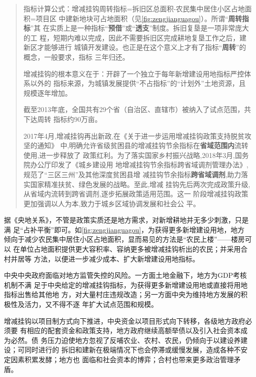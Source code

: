 \begin{quotation}
  指标计算公式：增减挂钩周转指标=拆旧区总面积-农民集中居住小区占地面积=项目区
  中建新地块可占地面积（见\cref{fig:zengjianguagou}）。所谓“\textbf{周转指标}”其
  在实质上是一种指标“\textbf{预借}”或“\textbf{透支}”制度。拆旧复垦是一项非常庞大的工
  程，短期内难以完成，因此不需要拆旧区完成耕地复垦工作之后，建新区才能够进行
  城镇开发建设。也正是在这个意义上才有了指标“\textbf{周转}”的概念，一般要求，指标
  三年归还。

  增减挂钩的根本意义在于：开辟了一个独立于每年新增建设用地指标严控体系以外的
  指标来源，为城镇发展提供“不占指标”的“计划外”土地资源，且规模逐年增加。\cite{yangdi}


  截至2013年底，全国共有29个省（自治区、直辖市）被纳入了试点范围，共下达周转
  指标约90万亩。

  2017年4月,增减挂钩再出新政,在《关于进一步运用增减挂钩政策支持脱贫攻坚的通知》
  中,明确允许省级贫困县的增减挂钩节余指标在\textbf{省域范围内}流转使用,进一步释放了
  政策红利。为了落实国家乡村振兴战略,2018年3月,国务院办公厅印发了《城乡建设用
  地增减挂钩节余指标跨省域调剂管理办法》,规范了“三区三州”及其他深度贫困县增
  减挂钩节余指标\textbf{跨省域调剂},助力落实国家精准扶贫、绿色发展的战略。至此,增减
  挂钩先后两次完成政策升级,从省域内流转到跨省调剂,逐步拓展政策适用范围。这一
  阶段增减挂钩政策更加强调以人为本,致力于城乡区域协调发展和社会公
  平。\cite{zengjianzongshu}
\end{quotation}

据《央地关系》，不管是政策实质还是地方需求，对新增耕地并无多少刺激，只是满
足“占补平衡”即可。如\cref{fig:zengjianguagou}，为获得更多新增建设用地，地方
倾向于减少农民集中居住小区占地面积，显而易见的方法是“农民上楼”——楼房可以
在单位占地面积提供更大容积率、容纳更多被增减挂钩析出的农民；并采用合村并居等
方法，以便进一步减少成本、扩大新增建设用地指标。

中央中央政府面临对地方监管失控的风险。一方面土地金融下，地方为GDP考核机制不满
足于中央给定的增减挂钩指标，为获得更多新增建设用地或直接将用地指标出售给其他地
方，对大量村庄违规改造；另一方面中央为维持地方发展的积极性及活力，又不得不逐
年扩大试点范围和规模。

增减挂钩以项目制方式向下推进，中央资金以项目形式向下转移，各级地方政府必须要
有相应的配套资金和政策支持，地方政府继续高额举债以及引入社会资本成为必然。债
务压力迫使地方忽视了反哺农业、农村、农民，仍倾向于以建设养建设；可同时进行的
拆旧和建新在极端情况下也会停滞或缓慢发展，造成各种不安定因素积累发酵；地方也
面临和社会资本的博弈；合村也带来更多政治管理矛盾。


